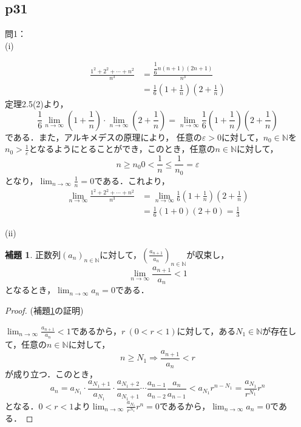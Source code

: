 \documentclass[dvipdfmx,uplatex,11pt]{jsarticle}
\theoremstyle{definition}
\newtheorem{lemm}{補題}[section]
\begin{document}
\subsection{p31}
問1：\\
(i)
\begin{leftbar}
	\begin{align*}
		\frac{1^2+2^2+\cdots+n^2}{n^3} & = \frac{\dfrac{1}{6}n(n+1)(2n+1)}{n^3} \\
		& =\frac{1}{6} \left(1+\frac{1}{n} \right ) \left(2+\frac{1}{n} \right)
	\end{align*}
	定理2.5(2)より，
	\[
		\frac{1}{6} \lim_{n \to \infty} \left(1+\frac{1}{n} \right) \cdot \lim_{n \to \infty} \left(2+\frac{1}{n} \right) =\lim_{n \to \infty} \frac{1}{6} \left(1+\frac{1}{n} \right ) \left(2+\frac{1}{n} \right)
	\]
	である．また，アルキメデスの原理により， 任意の$\varepsilon >0$に対して，$n_0 \in \mathbb{N}$を$n_0 >\frac{1}{\varepsilon}$となるようにとることができ，このとき，任意の$n \in \mathbb{N}$に対して，
	\[
		n \ge n_0 0<\frac{1}{n} \le \frac{1}{n_0} = \varepsilon
	\]
	となり，$\lim_{n \to \infty} \frac{1}{n} =0$である．これより，
	\begin{align*}
		\lim_{n \to \infty} \frac{1^2+2^2+\cdots+n^2}{n^3} & = \lim_{n \to \infty} \frac{1}{6} \left(1+\frac{1}{n} \right ) \left(2+\frac{1}{n} \right) \\
		& = \frac{1}{6} (1+0)(2+0) =\frac{1}{3}
	\end{align*}
\end{leftbar}
\newpage
(ii)
\begin{lemm}
    \label{p31:問1.2}
    正数列$(a_n)_{n \in \mathbb{N}}$に対して，$\left(\frac{a_{n+1}}{a_n} \right)_{n \in \mathbb{N}}$が収束し，
    \[
    \lim_{n \to \infty} \frac{a_{n+1}}{a_n} <1
    \]
    となるとき，$\lim_{n \to \infty} a_n =0$である．
\end{lemm}
%
\begin{proof}(補題\ref{p31:問1.2}の証明)\par 
   $ \lim_{n \to \infty} \frac{a_{n+1}}{a_n} <1$であるから，$r~(0<r<1)$に対して，ある$N_1 \in \mathbb{N}$が存在して，任意の$n \in \mathbb{N}$に対して，
   \[
       n \ge N_1 \Longrightarrow \frac{a_{n+1}}{a_n}<r
   \]
   が成り立つ．このとき，
   \[
       a_n = a_{N_1} \cdot \frac{a_{N_1+1}}{a_{N_1}} \cdot \frac{a_{N_1 +2}}{a_{N_1 +1}} \cdots \frac{a_{n-1}}{a_{n-2}} \frac{a_n}{a_{n-1}}< a_{N_1} r^{n-N_1}=\frac{a_{N_1}}{r^{N_1}} r^n
   \]
   となる．$0<r<1$より$\lim_{n \to \infty} \frac{a_{N_1}}{r^{N_1}} r^n =0$であるから，$\lim_{n \to \infty} a_n =0$である．
\end{proof}
\end{document}
